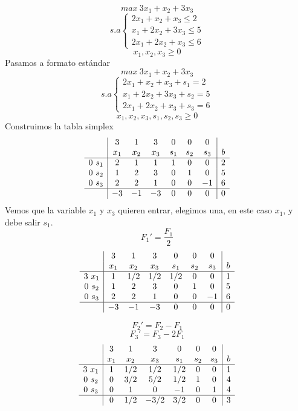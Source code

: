 \begin{ejemplo}
  $$  max ~ 3x_1+x_2+3x_3$$
  $$ s.a \left\{
    \begin{array}{c}
      2x_1+x_2+x_3\leq2\\
      x_1+2x_2+3x_3\leq 5 \\
      2x_1+2x_2+x_3\leq 6
    \end{array}
  \right.
  $$
  $$x_1, x_2, x_3\geq 0$$
  Pasamos a formato estándar
  $$  max ~ 3x_1+x_2+3x_3$$
  $$ s.a \left\{
    \begin{array}{c}
      2x_1+x_2+x_3 + s_1=2\\
      x_1+2x_2+3x_3+ s_2 = 5 \\
      2x_1+2x_2+x_3 + s_3=  6
    \end{array}
  \right.
  $$
  $$x_1, x_2, x_3, s_1, s_2, s_3 \geq 0$$
  Construimos la tabla simplex
  $$
  \begin{array}{c|cccccc|c}
    & 3 & 1 & 3 & 0 & 0 & 0 &  \\
    & x_1 & x_2 & x_3 & s_1 & s_2 & s_3 & b \\ \hline
    0 ~ s_1 & 2 & 1 & 1 & 1 & 0 & 0 & 2 \\
    0 ~ s_2 & 1 & 2 & 3 & 0 & 1 & 0 & 5 \\
    0 ~ s_3 & 2 & 2 & 1 & 0 & 0 & -1 & 6 \\ \hline
    & -3 & -1 & -3 & 0 & 0 & 0 & 0
  \end{array}
  $$
  Vemos que la variable $x_1$ y $x_3$ quieren entrar, elegimos una, en este caso $x_1$, y debe salir $s_1$. 
  $$ F_1'=\frac{F_1}{2} $$
  $$
  \begin{array}{c|cccccc|c}
    & 3 & 1 & 3 & 0 & 0 & 0 &  \\
    & x_1 & x_2 & x_3 & s_1 & s_2 & s_3 & b \\ \hline
    3 ~ x_1 & 1 & 1/2 & 1/2 & 1/2 & 0 & 0 & 1 \\
    0 ~ s_2 & 1 & 2 & 3 & 0 & 1 & 0 & 5 \\
    0 ~ s_3 & 2 & 2 & 1 & 0 & 0 & -1 & 6 \\ \hline
    & -3 & -1 & -3 & 0 & 0 & 0 & 0
  \end{array}
  $$

  $$ F_2'=F_2-F_1 $$
  $$ F_3'=F_3-2F_1 $$
  $$
  \begin{array}{c|cccccc|c}
    & 3 & 1 & 3 & 0 & 0 & 0 &  \\
    & x_1 & x_2 & x_3 & s_1 & s_2 & s_3 & b \\ \hline
    3 ~ x_1 & 1 & 1/2 & 1/2 & 1/2 & 0 & 0 & 1 \\
    0 ~ s_2 & 0 & 3/2 & 5/2 & 1/2 & 1 & 0 & 4 \\
    0 ~ s_3 & 0 & 1 & 0 & -1 & 0 & 1 & 4 \\ \hline
    & 0 & 1/2 & -3/2 & 3/2 & 0 & 0 & 3
  \end{array}
  $$


\end{ejemplo}
